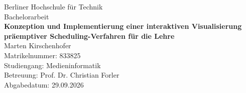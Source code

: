 \begin{titlepage}
    \begin{center}
        {\LARGE Berliner Hochschule für Technik\\}
        \vspace{1cm}
        {\Large Bachelorarbeit\\}
        \vspace{2cm}
        {\huge\textbf{Konzeption und Implementierung einer interaktiven Visualisierung präemptiver
                Scheduling-Verfahren für die Lehre }\\}
        \vfill
        {Marten Kirschenhofer\\
            Matrikelnummer: 833825\\
            Studiengang: Medieninformatik\\}
        \vspace{1cm}
        {Betreuung: Prof. Dr. Christian Forler\\
            Abgabedatum: 29.09.2026\\}
    \end{center}
\end{titlepage}
